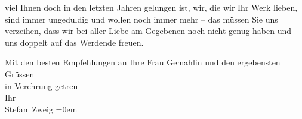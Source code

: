                viel Ihnen doch in den letzten Jahren gelungen ist, wir, die wir Ihr Werk lieben,
               sind immer  ungeduldig und wollen noch immer {\pb}mehr – das müssen Sie uns verzeihen,
               dass wir bei aller Liebe am Gegebenen noch nicht genug haben und uns doppelt auf das
               Werdende freuen.\pend
           
\pstart
           Mit den besten Empfehlungen an Ihre Frau Gemahlin und den ergebensten Grüssen{\\[\baselineskip]}in Verehrung
               getreu{\\[\baselineskip]} Ihr{\\[\baselineskip]}\spacefill\mbox{Stefan Zweig}\pend
           \leftskip=0em{}\endnumbering{}  
      